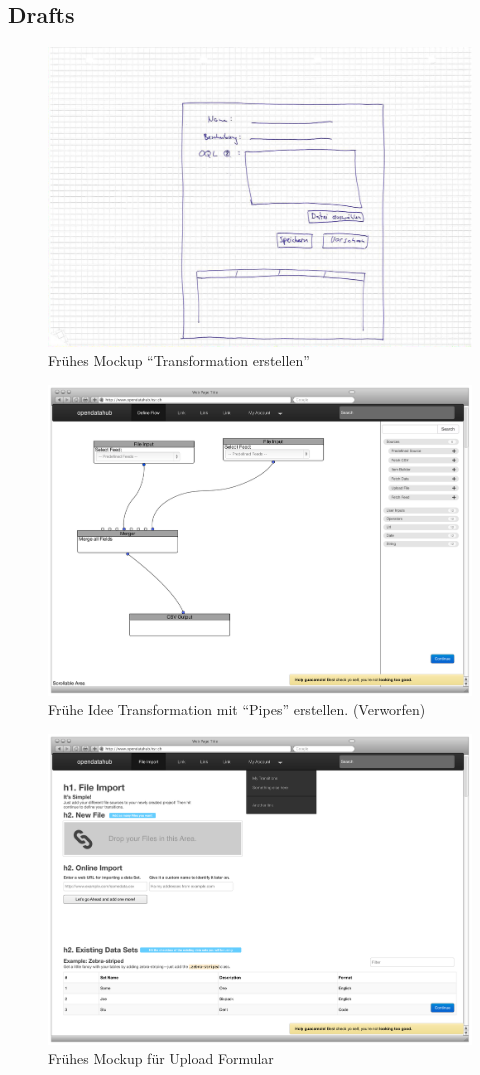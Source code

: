 \subsection{Drafts}
\begin{figure}[H]
    \centering
    \includegraphics[width=0.6\linewidth]{fig/mockup_hcdi}
    \caption{Frühes Mockup ``Transformation erstellen''}
    \label{fig:pd:mockup-upload}
\end{figure}
\begin{figure}[H]
    \centering
    \includegraphics[width=0.8\linewidth]{fig/Wireframes-Connectors}
    \caption{Frühe Idee Transformation mit ``Pipes'' erstellen. (Verworfen)}
    \label{fig:pd:connectors}
\end{figure}
\begin{figure}[H]
    \centering
    \includegraphics[width=0.8\linewidth]{fig/Wireframes-Upload}
    \caption{Frühes Mockup für Upload Formular}
    \label{fig:pd:wireframe-upload}
\end{figure}

